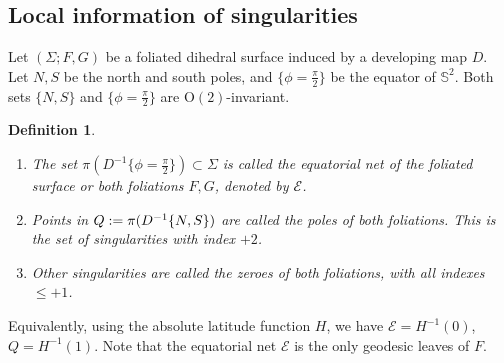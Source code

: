 \documentclass[pdflatex,sn-mathphys]{sn-jnl}%
\numberwithin{equation}{section}
\theoremstyle{thmstyleone}%
\newtheorem{definition}[theorem]{Definition}
\newcommand{\STwo}{\mathbb{S}^2}
\newcommand{\Otwo}{\mathrm{O}(2)}
\newcommand{\SYM}{\textcolor{black}}
\newcommand{\DEF}{\emph}
\begin{document}
\subsection{Local information of singularities}\label{sec:singular_info}
Let $(\Sigma;F,G)$ be a foliated dihedral surface induced by a developing map $D$.
Let $N,S$ be the north and south poles, and $\{\phi=\frac\pi2\}$ be the equator of $\STwo$. Both sets $\{N,S\}$ and $\{\phi=\frac\pi2\}$ are $\Otwo$-invariant.
\begin{definition}\label{def:singular_info} ~
\begin{enumerate}
    \item The set $\pi (D^{-1} \{\phi=\frac\pi2\}) \subset \Sigma$  %
    is called the \DEF{equatorial net} of the foliated surface or both foliations $F,G$, denoted by \SYM{$\mathcal{E}$}.
    \item Points in $\SYM{Q}:=\pi (D^{-1}\{N,S\}) $ %
    are called the \DEF{poles} of both foliations. %
    This is the set of singularities with index $+2$.
    \item Other singularities are called the \DEF{zeroes} of both foliations, with all indexes $\leq +1$.
\end{enumerate}
\end{definition}

Equivalently, using the absolute latitude function $H$, we have $\mathcal{E}=H^{-1}(0)$, $Q=H^{-1}(1)$. Note that the equatorial net $\mathcal{E}$ is the only geodesic leaves of $F$.

\end{document}
